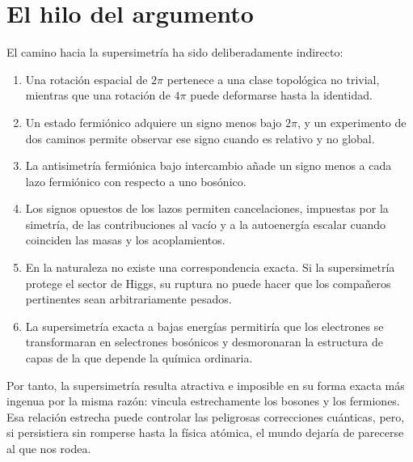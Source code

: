 \section{El hilo del argumento}

El camino hacia la supersimetría ha sido deliberadamente indirecto:
\begin{enumerate}
\item Una rotación espacial de \(2\pi\) pertenece a una clase topológica no trivial, mientras que una rotación de \(4\pi\) puede deformarse hasta la identidad.
\item Un estado fermiónico adquiere un signo menos bajo \(2\pi\), y un experimento de dos caminos permite observar ese signo cuando es relativo y no global.
\item La antisimetría fermiónica bajo intercambio añade un signo menos a cada lazo fermiónico con respecto a uno bosónico.
\item Los signos opuestos de los lazos permiten cancelaciones, impuestas por la simetría, de las contribuciones al vacío y a la autoenergía escalar cuando coinciden las masas y los acoplamientos.
\item En la naturaleza no existe una correspondencia exacta. Si la supersimetría protege el sector de Higgs, su ruptura no puede hacer que los compañeros pertinentes sean arbitrariamente pesados.
\item La supersimetría exacta a bajas energías permitiría que los electrones se transformaran en selectrones bosónicos y desmoronaran la estructura de capas de la que depende la química ordinaria.
\end{enumerate}

Por tanto, la supersimetría resulta atractiva e imposible en su forma exacta más ingenua por la misma razón: vincula estrechamente los bosones y los fermiones. Esa relación estrecha puede controlar las peligrosas correcciones cuánticas, pero, si persistiera sin romperse hasta la física atómica, el mundo dejaría de parecerse al que nos rodea.